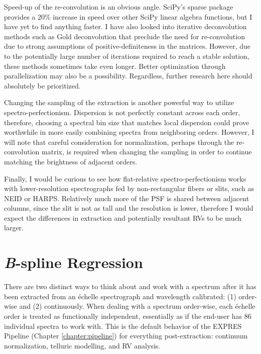 Speed-up of the re-convolution is an obvious angle. SciPy's sparse package provides a 20\% increase in speed over other SciPy linear algebra functions, but I have yet to find anything faster. I have also looked into iterative deconvolution methods such as Gold deconvolution \citep{morhac_efficient_2003, morhac_deconvolution_2006} that preclude the need for re-convolution due to strong assumptions of positive-definiteness in the matrices. However, due to the potentially large number of iterations required to reach a stable solution, these methods sometimes take even longer. Better optimization through parallelization may also be a possibility. Regardless, further research here should absolutely be prioritized.

Changing the sampling of the extraction is another powerful way to utilize spectro-perfectionism. Dispersion is not perfectly constant across each order, therefore, choosing a spectral bin size that matches local dispersion could prove worthwhile in more easily combining spectra from neighboring orders. However, I will note that careful consideration for normalization, perhaps through the re-convolution matrix, is required when changing the sampling in order to continue matching the brightness of adjacent orders.

Finally, I would be curious to see how flat-relative spectro-perfectionism works with lower-resolution spectrographs fed by non-rectangular fibers or slits, such as NEID or HARPS. Relatively much more of the PSF is shared between adjacent columns, since the slit is not as tall and the resolution is lower, therefore I would expect the differences in extraction and potentially resultant RVs to be much larger.

\section{\textit{B}-spline Regression} \label{pipeline2:bspline}

There are two distinct ways to think about and work with a spectrum after it has been extracted from an \'{e}chelle spectrograph and wavelength calibrated: (1) order-wise and (2) continuously. When dealing with a spectrum order-wise, each \'{e}chelle order is treated as functionally independent, essentially as if the end-user has 86 individual spectra to work with. This is the default behavior of the EXPRES Pipeline (Chapter \ref{chapter:pipeline}) for everything post-extraction: continuum normalization, telluric modelling, and RV analysis.


